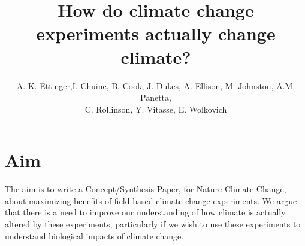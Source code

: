 \documentclass{article}
\begin{document}
% 
\title{How do climate change experiments actually change climate?} %
\author{A. K. Ettinger,I. Chuine, B. Cook, J. Dukes, A. Ellison, M. Johnston, A.M. Panetta,\\ C. Rollinson, Y. Vitasse, E. Wolkovich}
\maketitle  %

\section {Aim}

The aim is to write a Concept/Synthesis Paper, for Nature Climate Change, about maximizing benefits of field-based climate change experiments. We argue that there is a need to improve our understanding of how climate is actually altered by these experiments, particularly if we wish to use these experiments to understand biological impacts of climate change. %
\end{document}
